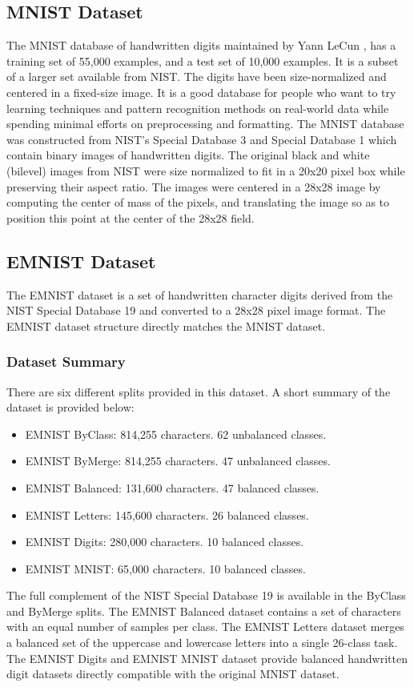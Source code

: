 \subsection{MNIST Dataset}
The MNIST database of handwritten digits maintained by Yann LeCun \cite{MNIST}, has a training set of 55,000 examples, and a test set of 10,000 examples. It is a subset of a larger set available from NIST. The digits have been size-normalized and centered in a fixed-size image. It is a good database for people who want to try learning techniques and pattern recognition methods on real-world data while spending minimal efforts on preprocessing and formatting. The MNIST database was constructed from NIST's Special Database 3 and Special Database 1 which contain binary images of handwritten digits. The original black and white (bilevel) images from NIST were size normalized to fit in a 20x20 pixel box while preserving their aspect ratio. The images were centered in a 28x28 image by computing the center of mass of the pixels, and translating the image so as to position this point at the center of the 28x28 field.

\subsection{EMNIST Dataset}
The EMNIST dataset is a set of handwritten character digits derived from the NIST Special Database 19
and converted to a 28x28 pixel image format. The EMNIST dataset structure directly matches the MNIST dataset.

\subsubsection{Dataset Summary}
There are six different splits provided in this dataset. A short summary of the dataset is provided below:
\begin{itemize}
  \item EMNIST ByClass: 814,255 characters. 62 unbalanced classes.
  \item EMNIST ByMerge: 814,255 characters. 47 unbalanced classes.
  \item EMNIST Balanced:  131,600 characters. 47 balanced classes.
  \item EMNIST Letters: 145,600 characters. 26 balanced classes.
  \item EMNIST Digits: 280,000 characters. 10 balanced classes.
  \item EMNIST MNIST: 65,000 characters. 10 balanced classes.
\end{itemize}
The full complement of the NIST Special Database 19 is available in the ByClass and ByMerge splits. The EMNIST Balanced dataset contains a set of characters with an equal number of samples per class.
The EMNIST Letters dataset merges a balanced set of the uppercase and lowercase letters into a single 26-class task. The EMNIST Digits and EMNIST MNIST dataset provide balanced handwritten digit datasets directly compatible with the original MNIST dataset.


